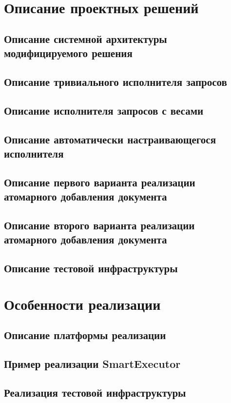 \documentclass{matmex-diploma}
\begin{document}
\section{Описание проектных решений}
    \subsection{Описание системной архитектуры модифицируемого решения}
    \subsection{Описание тривиального исполнителя запросов}
    \subsection{Описание исполнителя запросов с весами}
    \subsection{Описание автоматически настраивающегося исполнителя}
    \subsection{Описание первого варианта реализации атомарного добавления документа}
    \subsection{Описание второго варианта реализации атомарного добавления документа}
    \subsection{Описание тестовой инфраструктуры}
    
\section{Особенности реализации}
    \subsection{Описание платформы реализации}
    \subsection{Пример реализации SmartExecutor}
    \subsection{Реализация тестовой инфраструктуры}
\end{document}

